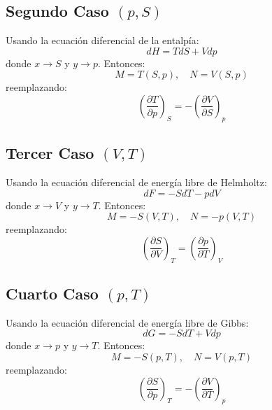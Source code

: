 \subsection{Segundo Caso $(p, S)$}
Usando la ecuación diferencial de la entalpía:
\[
dH=TdS+Vdp
\]
donde $x\rightarrow S$ y $y \rightarrow p$. Entonces:
\[
M=T(S,p), \quad N=V(S,p)
\]
reemplazando:
\begin{equation}
    \boxed{
    \left( \frac{\partial T}{\partial p} \right)_S = -\left( \frac{\partial V}{\partial  S} \right)_p
    }
\end{equation}

\subsection{Tercer Caso $(V,T)$}
Usando la ecuación diferencial de energía libre de Helmholtz:
\[
dF=-SdT-pdV
\]
donde $x\rightarrow V$ y $y \rightarrow T$. Entonces:
\[
M=-S(V,T), \quad N=-p(V,T)
\]
reemplazando:
\begin{equation}
    \boxed{
    \left( \frac{\partial  S}{\partial V} \right)_T = \left( \frac{\partial p}{\partial  T} \right)_V
    }
\end{equation}

\subsection{Cuarto Caso $(p,T)$}
Usando la ecuación diferencial de energía libre de Gibbs:
\[
dG=-SdT+Vdp
\]
donde $x\rightarrow p$ y $y \rightarrow T$. Entonces:
\[
M=-S(p,T), \quad N=V(p,T)
\]
reemplazando:
\begin{equation}
    \boxed{
    \left( \frac{\partial  S}{\partial p} \right)_T = -\left( \frac{\partial V}{\partial  T} \right)_p
    }
\end{equation}

